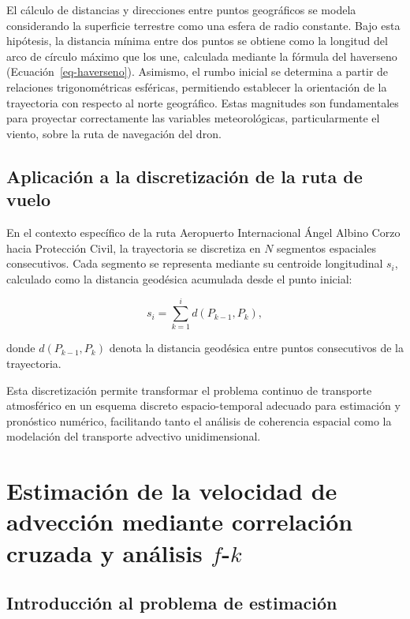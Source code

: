 \documentclass[
  spanish,
  us-letterpaper,
]{scrreprt}
\numberwithin{equation}{section}
\begin{document}
El cálculo de distancias y direcciones entre puntos geográficos se
modela considerando la superficie terrestre como una esfera de radio
constante. Bajo esta hipótesis, la distancia mínima entre dos puntos se
obtiene como la longitud del arco de círculo máximo que los une,
calculada mediante la fórmula del haverseno
(Ecuación~\ref{eq-haverseno}). Asimismo, el rumbo inicial se determina a
partir de relaciones trigonométricas esféricas, permitiendo establecer
la orientación de la trayectoria con respecto al norte geográfico. Estas
magnitudes son fundamentales para proyectar correctamente las variables
meteorológicas, particularmente el viento, sobre la ruta de navegación
del dron.

\subsection{Aplicación a la discretización de la ruta de
vuelo}\label{aplicaciuxf3n-a-la-discretizaciuxf3n-de-la-ruta-de-vuelo}

En el contexto específico de la ruta Aeropuerto Internacional Ángel
Albino Corzo hacia Protección Civil, la trayectoria se discretiza en
\(N\) segmentos espaciales consecutivos. Cada segmento se representa
mediante su centroide longitudinal \(s_i\), calculado como la distancia
geodésica acumulada desde el punto inicial:

\[
s_i = \sum_{k=1}^{i} d(P_{k-1}, P_k),
\]

donde \(d(P_{k-1}, P_k)\) denota la distancia geodésica entre puntos
consecutivos de la trayectoria.

Esta discretización permite transformar el problema continuo de
transporte atmosférico en un esquema discreto espacio-temporal adecuado
para estimación y pronóstico numérico, facilitando tanto el análisis de
coherencia espacial como la modelación del transporte advectivo
unidimensional.

\section{\texorpdfstring{Estimación de la velocidad de advección
mediante correlación cruzada y análisis
\(f\)-\(k\)}{Estimación de la velocidad de advección mediante correlación cruzada y análisis f-k}}\label{sec-analisisadveccion}

\subsection{Introducción al problema de
estimación}\label{introducciuxf3n-al-problema-de-estimaciuxf3n}
\end{document}
